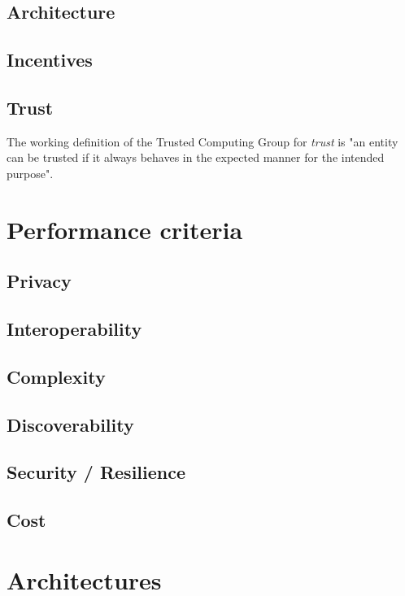 \documentclass[journal]{IEEEtran}
\begin{document}
\subsection{Architecture}

\subsection{Incentives}

\subsection{Trust}

The working definition of the Trusted Computing Group for \emph{trust} is "an entity can be trusted if it always behaves in the expected manner for the intended purpose".



\section{Performance criteria}

\subsection{Privacy}

\subsection{Interoperability}

\subsection{Complexity}

\subsection{Discoverability}

\subsection{Security / Resilience}

\subsection{Cost}



\section{Architectures}
\end{document}
